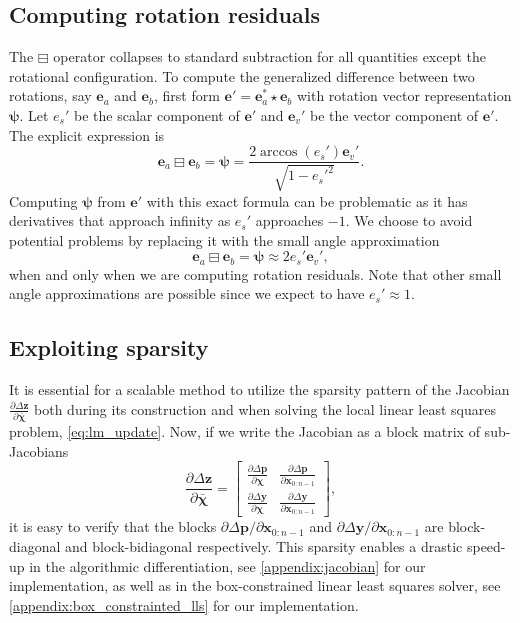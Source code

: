 \documentclass[preprint,12pt]{elsarticle}
\let\vec\bm
\def\param{\vec{\chi}}
\let\amssymbboxminus\boxminus
\renewcommand{\boxminus}{\mathbin{\mathop\amssymbboxminus}}
\numberwithin{equation}{section}
\def\rv{\psi}
\def\quat{e}
\def\combresiduals{ \Delta \vec{z}}
\begin{document}
\subsection{Computing rotation residuals}
The $\boxminus$ operator collapses to standard subtraction for all quantities except the rotational configuration.
To compute the generalized difference between two rotations, say $\vec{\quat}_a$ and $\vec{\quat}_b$, first form $\vec{\quat}' = \vec{\quat}^*_a \star \vec{\quat}_b$ with rotation vector representation $\vec{\psi}$. Let $e_s'$ be the scalar component of $\vec{e}'$ and $\vec{e}_v'$ be the vector component of $\vec{e}'$.
The explicit expression is
\begin{equation}
    \label{eq:exact_quat_residual}
    \vec{\quat}_a \boxminus \vec{\quat}_b = \vec{\rv} = \frac{2 \arccos (\quat_s') \vec{\quat}_v'}{\sqrt{1 - {\quat_s'}^2}}.
\end{equation}
Computing $\vec{\rv}$ from $\vec{\quat}'$ with this exact formula can be problematic as it has derivatives that approach infinity as $e_s'$ approaches $-1$.
We choose to avoid potential problems by replacing it with the small angle approximation
\begin{equation}
    \label{eq:rv_from_quat_approx}
    \vec{\quat}_a \boxminus \vec{\quat}_b = \vec{\rv} \approx 2 e_s' \vec{e}_v',
\end{equation}
when and only when we are computing rotation residuals. 
Note that other small angle approximations are possible since we expect to have $e_s' \approx 1$.

\subsection{Exploiting sparsity}
It is essential for a scalable method to utilize the sparsity pattern of the Jacobian $\frac{\partial \combresiduals}{\partial \bar{\param}}$ both during its construction and when solving the local linear least squares problem, \eqref{eq:lm_update}.
Now, if we write the Jacobian as a block matrix of sub-Jacobians
\begin{equation}
    \frac{\partial \combresiduals }{\partial \bar{\param}} = 
    \begin{bmatrix}
        \frac{\partial \Delta \vec{p}}{\partial \param} & \frac{\partial \Delta \vec{p}}{\partial \vec{x}_{0:n-1}} \\
        \frac{\partial  \Delta \vec{y} }{\partial \param} & \frac{\partial \Delta \vec{y}}{\partial \vec{x}_{0:n-1}}
    \end{bmatrix},
\end{equation}
it is easy to verify that the blocks $\partial \Delta \vec{p} / \partial \vec{x}_{0:n-1}$ and $\partial \Delta \vec{y} / \partial \vec{x}_{0:n-1}$ are block-diagonal and block-bidiagonal respectively.
This sparsity enables a drastic speed-up in the algorithmic differentiation, see \ref{appendix:jacobian} for our implementation, as well as in the box-constrained linear least squares solver, see \ref{appendix:box_constrainted_lls} for our implementation.
\end{document}
